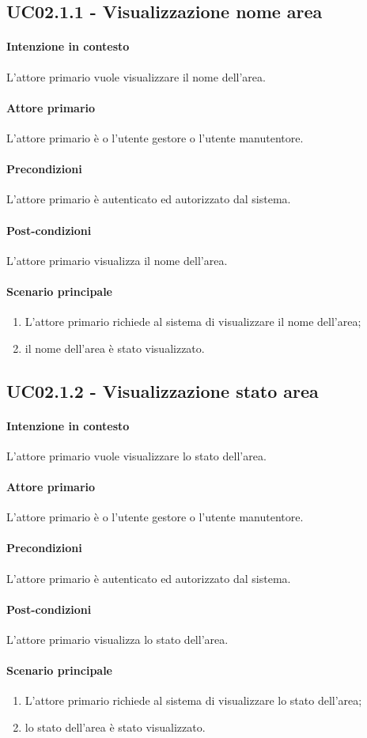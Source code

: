 \subsection{UC02.1.1 - Visualizzazione nome area}\label{uc:02.1.1}

\paragraph{Intenzione in contesto} L'attore primario vuole visualizzare il nome dell'area.
\paragraph{Attore primario} L'attore primario è o l'utente gestore o l'utente manutentore.
\paragraph{Precondizioni} L'attore primario è autenticato ed autorizzato dal sistema.
\paragraph{Post-condizioni} L'attore primario visualizza il nome dell'area.
\paragraph{Scenario principale}
\begin{enumerate}
    \item L'attore primario richiede al sistema di visualizzare il nome dell'area;
    \item il nome dell'area è stato visualizzato.
\end{enumerate}

\subsection{UC02.1.2 - Visualizzazione stato area}\label{uc:02.1.2}

\paragraph{Intenzione in contesto} L'attore primario vuole visualizzare lo stato dell'area.
\paragraph{Attore primario} L'attore primario è o l'utente gestore o l'utente manutentore.
\paragraph{Precondizioni} L'attore primario è autenticato ed autorizzato dal sistema.
\paragraph{Post-condizioni} L'attore primario visualizza lo stato dell'area.
\paragraph{Scenario principale}
\begin{enumerate}
    \item L'attore primario richiede al sistema di visualizzare lo stato dell'area;
    \item lo stato dell'area è stato visualizzato.
\end{enumerate}
